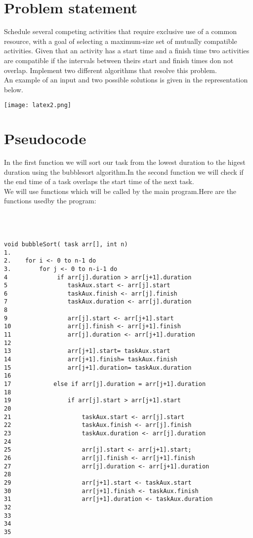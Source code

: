 \documentclass[14pt]{article}
\begin{document}
\section*{Problem statement}
    Schedule several competing activities that require
exclusive use of a common resource, with a goal of selecting a maximum-size
set of mutually compatible activities. Given that an activity has a start time and a
finish time two activities are compatible if the intervals between theirs start and
finish times don not overlap. Implement two different algorithms that resolve this
problem.
\\
An example of an input and two possible solutions is given in the representation below.
\begin{flushleft}\texttt{[image: latex2.png]}
\end{flushleft}



\newpage
\section*{Pseudocode}
In the first function we will sort our task from the lowest duration to the higest duration using the bubblesort algorithm.In the second function we will check if the end time of a task overlaps the start time of the next task.
\\
We will use functions which will be called by the main program.Here are the functions usedby the program:
\\
\\
\\
\begin{lstlisting}

void bubbleSort( task arr[], int n)
1.                                         
2.    for i <- 0 to n-1 do
3.        for j <- 0 to n-i-1 do
4              if arr[j].duration > arr[j+1].duration
5                 taskAux.start <- arr[j].start            
6                 taskAux.finish <- arr[j].finish
7                 taskAux.duration <- arr[j].duration
8
9                 arr[j].start <- arr[j+1].start              
10                arr[j].finish <- arr[j+1].finish
11                arr[j].duration <- arr[j+1].duration
12
13                arr[j+1].start= taskAux.start             
14                arr[j+1].finish= taskAux.finish
15                arr[j+1].duration= taskAux.duration
16        
17            else if arr[j].duration = arr[j+1].duration
18            
19                if arr[j].start > arr[j+1].start
20                
21                    taskAux.start <- arr[j].start            
22                    taskAux.finish <- arr[j].finish
23                    taskAux.duration <- arr[j].duration
24
25                    arr[j].start <- arr[j+1].start;             
26                    arr[j].finish <- arr[j+1].finish
27                    arr[j].duration <- arr[j+1].duration
28
29                    arr[j+1].start <- taskAux.start            
30                    arr[j+1].finish <- taskAux.finish
31                    arr[j+1].duration <- taskAux.duration
32
33
34
35
\end{lstlisting}
\end{document}
